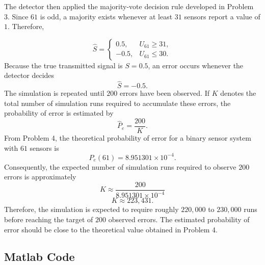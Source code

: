 \documentclass[12pt,a4paper]{article}
\begin{document}
The detector then applied the majority-vote decision rule developed in Problem 3. Since \(61\) is odd, a majority exists whenever at least \(31\) sensors report a value of \(1\). Therefore,

\[
\hat{S}=
\begin{cases}
0.5, & U_{61}\geq 31,\\
-0.5, & U_{61}\leq 30.
\end{cases}
\]
Because the true transmitted signal is \(S=0.5\), an error occurs whenever the detector decides
\[
\hat{S}=-0.5.
\]
The simulation is repeated until \(200\) errors have been observed. If \(K\) denotes the total number of simulation runs required to accumulate these errors, the probability of error is estimated by
\[
\hat{P}_e=\frac{200}{K}.
\]
From Problem 4, the theoretical probability of error for a binary sensor system with \(61\) sensors is
\[
P_e(61)
=
8.951301\times10^{-4}.
\]
Consequently, the expected number of simulation runs required to observe \(200\) errors is approximately
\[
K
\approx
\frac{200}{8.951301\times10^{-4}}
\]
\[
K
\approx
223{,}431.
\]
Therefore, the simulation is expected to require roughly \(220{,}000\) to \(230{,}000\) runs before reaching the target of \(200\) observed errors. The estimated probability of error should be close to the theoretical value obtained in Problem 4.

\subsection{Matlab Code}
\end{document}
